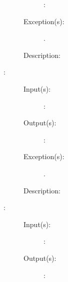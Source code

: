 \begin{description}
\begin{description}
		\begin{description}\item[]
		\item[: ]
		\end{description}
	\item[Exception(s): ]
		\begin{description}\item[]
		\item[.]
		\end{description}
	\item[Description: ]
	\end{description}
\label{thd_}
\item[{\cfunc[]{thd\_}{}}: ]
	\begin{description}\item[]
	\item[Input(s): ]
		\begin{description}\item[]
		\item[: ]
		\end{description}
	\item[Output(s): ]
		\begin{description}\item[]
		\item[: ]
		\end{description}
	\item[Exception(s): ]
		\begin{description}\item[]
		\item[.]
		\end{description}
	\item[Description: ]
	\end{description}
\label{thd_}
\item[{\cfunc[]{thd\_}{}}: ]
	\begin{description}\item[]
	\item[Input(s): ]
		\begin{description}\item[]
		\item[: ]
		\end{description}
	\item[Output(s): ]
		\begin{description}\item[]
		\item[: ]
		\end{description}

\end{description}
\end{description}
